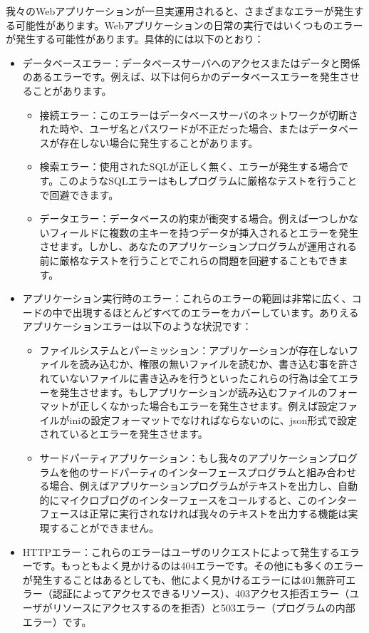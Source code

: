 我々のWebアプリケーションが一旦実運用されると、さまざまなエラーが発生する可能性があります。Webアプリケーションの日常の実行ではいくつものエラーが発生する可能性があります。具体的には以下のとおり：

\begin{itemize}
  \item データベースエラー：データベースサーバへのアクセスまたはデータと関係のあるエラーです。例えば、以下は何らかのデータベースエラーを発生させることがあります。
\begin{itemize}
  \item 接続エラー：このエラーはデータベースサーバのネットワークが切断された時や、ユーザ名とパスワードが不正だった場合、またはデータベースが存在しない場合に発生することがあります。
  \item 検索エラー：使用されたSQLが正しく無く、エラーが発生する場合です。このようなSQLエラーはもしプログラムに厳格なテストを行うことで回避できます。
  \item データエラー：データベースの約束が衝突する場合。例えば一つしかないフィールドに複数の主キーを持つデータが挿入されるとエラーを発生させます。しかし、あなたのアプリケーションプログラムが運用される前に厳格なテストを行うことでこれらの問題を回避することもできます。
\end{itemize}
  \item アプリケーション実行時のエラー：これらのエラーの範囲は非常に広く、コードの中で出現するほとんどすべてのエラーをカバーしています。ありえるアプリケーションエラーは以下のような状況です：
\begin{itemize}
  \item ファイルシステムとパーミッション：アプリケーションが存在しないファイルを読み込むか、権限の無いファイルを読むか、書き込む事を許されていないファイルに書き込みを行うといったこれらの行為は全てエラーを発生させます。もしアプリケーションが読み込むファイルのフォーマットが正しくなかった場合もエラーを発生させます。例えば設定ファイルがiniの設定フォーマットでなければならないのに、json形式で設定されているとエラーを発生させます。
  \item サードパーティアプリケーション：もし我々のアプリケーションプログラムを他のサードパーティのインターフェースプログラムと組み合わせる場合、例えばアプリケーションプログラムがテキストを出力し、自動的にマイクロブログのインターフェースをコールすると、このインターフェースは正常に実行されなければ我々のテキストを出力する機能は実現することができません。
\end{itemize}
  \item HTTPエラー：これらのエラーはユーザのリクエストによって発生するエラーです。もっともよく見かけるのは404エラーです。その他にも多くのエラーが発生することはあるとしても、他によく見かけるエラーには401無許可エラー（認証によってアクセスできるリソース）、403アクセス拒否エラー（ユーザがリソースにアクセスするのを拒否）と503エラー（プログラムの内部エラー）です。

\end{itemize}
